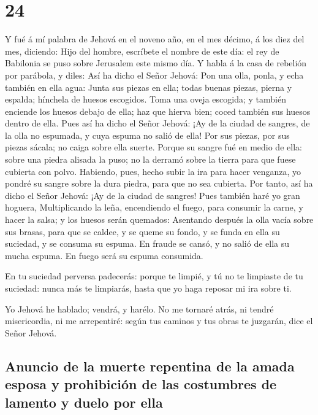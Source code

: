 \hypertarget{section-23}{%
\section{24}\label{section-23}}

 Y fué á mí palabra de Jehová en el noveno año, en el mes
décimo, á los diez del mes, diciendo:  Hijo del hombre,
escríbete el nombre de este día: el rey de Babilonia se puso sobre
Jerusalem este mismo día.  Y habla á la casa de rebelión por
parábola, y diles: Así ha dicho el Señor Jehová: Pon una olla, ponla, y
echa también en ella agua:  Junta sus piezas en ella; todas
buenas piezas, pierna y espalda; hínchela de huesos escogidos.
 Toma una oveja escogida; y también enciende los huesos
debajo de ella; haz que hierva bien; coced también sus huesos dentro de
ella.  Pues así ha dicho el Señor Jehová: ¡Ay de la ciudad
de sangres, de la olla no espumada, y cuya espuma no salió de ella! Por
sus piezas, por sus piezas sácala; no caiga sobre ella suerte.
 Porque su sangre fué en medio de ella: sobre una piedra
alisada la puso; no la derramó sobre la tierra para que fuese cubierta
con polvo.  Habiendo, pues, hecho subir la ira para hacer
venganza, yo pondré su sangre sobre la dura piedra, para que no sea
cubierta.  Por tanto, así ha dicho el Señor Jehová: ¡Ay de
la ciudad de sangres! Pues también haré yo gran hoguera, 
Multiplicando la leña, encendiendo el fuego, para consumir la carne, y
hacer la salsa; y los huesos serán quemados:  Asentando
después la olla vacía sobre sus brasas, para que se caldee, y se queme
su fondo, y se funda en ella su suciedad, y se consuma su espuma.
 En fraude se cansó, y no salió de ella su mucha espuma. En
fuego será su espuma consumida.

 En tu suciedad perversa padecerás: porque te limpié, y tú
no te limpiaste de tu suciedad: nunca más te limpiarás, hasta que yo
haga reposar mi ira sobre ti.

 Yo Jehová he hablado; vendrá, y harélo. No me tornaré
atrás, ni tendré misericordia, ni me arrepentiré: según tus caminos y
tus obras te juzgarán, dice el Señor Jehová.

\hypertarget{anuncio-de-la-muerte-repentina-de-la-amada-esposa-y-prohibiciuxf3n-de-las-costumbres-de-lamento-y-duelo-por-ella}{%
\subsection{Anuncio de la muerte repentina de la amada esposa y
prohibición de las costumbres de lamento y duelo por
ella}\label{anuncio-de-la-muerte-repentina-de-la-amada-esposa-y-prohibiciuxf3n-de-las-costumbres-de-lamento-y-duelo-por-ella}}


